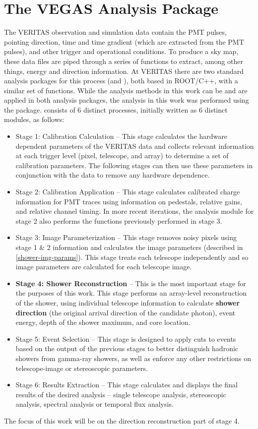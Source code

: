 \documentclass[main.tex]{subfiles}
\begin{document}
\section{The VEGAS Analysis Package}
The VERITAS observation and simulation data contain the PMT pulses, pointing direction, time and time gradient (which are extracted from the PMT pulses), and other trigger and operational conditions. To produce a sky map, these data files are piped through a series of functions to extract, among other things, energy and direction information. At VERITAS there are two standard analysis packages for this process (\vegas  and \ed), both based in ROOT/C++, with a similar set of functions. While the analysis methods in this work can be and are applied in both analysis packages, the analysis in this work was performed using the \vegas package.
\vegas consists of 6 distinct processes, initially written as 6 distinct modules, as follows:
\begin{itemize}
\item Stage 1: Calibration Calculation -- This stage calculates the hardware dependent parameters of the VERITAS data and collects relevant information at each trigger level (pixel, telescope, and array) to determine a set of calibration parameters. The following stages can then use these parameters in conjunction with the data to remove any hardware dependence.
\item Stage 2: Calibration Application -- This stage calculates calibrated charge information for PMT traces using information on pedestals, relative gains, and relative channel timing. In more recent iterations, the analysis module for stage 2 also performs the functions previously performed in stage 3. 
\item Stage 3: Image Parameterization -- This stage removes noisy pixels using stage 1 \& 2 information and calculates the image parameters (described in \ref{shower-img-params}). This stage treats each telescope independently and so image parameters are calculated for each telescope image.
\item \textbf{Stage 4: Shower Reconstruction} -- This is the most important stage for the purposes of this work. This stage performs an array-level reconstruction of the shower, using individual telescope information to calculate \textbf{shower direction} (the original arrival direction of the candidate photon), event energy, depth of the shower maximum, and core location.
\item Stage 5: Event Selection -- This stage is designed to apply cuts to events based on the output of the previous stages to better distinguish hadronic showers from gamma-ray showers, as well as enforce any other restrictions on telescope-image or stereoscopic parameters.
\item Stage 6: Results Extraction -- This stage calculates and displays the final results of the desired analysis -- single telescope analysis, stereoscopic analysis, spectral analysis or temporal flux analysis.
\end{itemize}
The focus of this work will be on the direction reconstruction part of stage 4.
\end{document}
